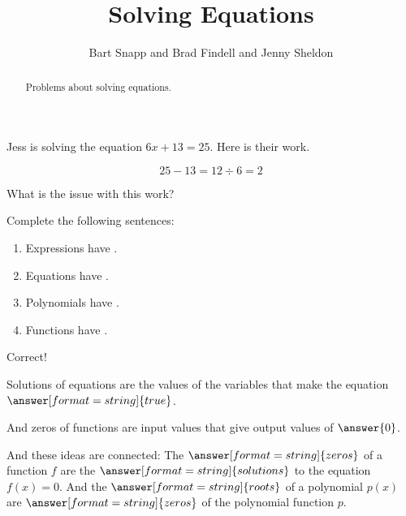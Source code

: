 \documentclass[nooutcomes]{ximera}
\title{Solving Equations}
\author{Bart Snapp and Brad Findell and Jenny Sheldon}
\begin{document}
\begin{abstract}
Problems about solving equations.
\end{abstract}
\maketitle





\begin{problem}
Jess is solving the equation $6x+13 = 25$.  Here is their work.

\[
25 - 13 = 12 \div 6 = 2
\]
\end{problem}

What is the issue with this work?
\begin{multipleChoice}
\end{multipleChoice}



\begin{problem}
Complete the following sentences: 
\begin{enumerate}
\item Expressions have . 
\item Equations have .
\item Polynomials have .
\item Functions have .
\end{enumerate}

\begin{problem}
Correct!  

Solutions of equations are the values of the variables that make the equation $\answer[format=string]{true}$.  

And zeros of functions are input values that give output values of $\answer{0}$.  

And these ideas are connected:  The $\answer[format=string]{zeros}$ of a function $f$ are 
the $\answer[format=string]{solutions}$ to the equation $f(x)=0$.  
And the $\answer[format=string]{roots}$ of a polynomial $p(x)$ are $\answer[format=string]{zeros}$ of the polynomial function $p$.   
\end{problem}
\end{problem}
\end{document}
